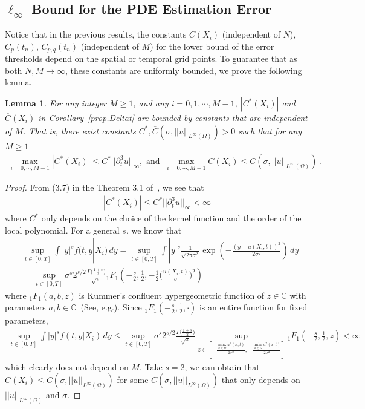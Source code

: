 \documentclass[a4paper,11pt]{article}
\newtheorem{lemma}{Lemma}[section]
\theoremstyle{definition}
\begin{document}
\subsection{$\ell_\infty$ Bound for the PDE Estimation Error}
Notice that in the previous results, the constants $C(X_i)$ (independent of $N$), $C_p(t_n)$, $C_{p,q}(t_n)$ (independent of $M$) for the lower bound of the error thresholds depend on the spatial or temporal grid points. To guarantee that as both $N,M\to\infty$, these constants are uniformly bounded, we prove the following lemma.
\begin{lemma}\label{lemma}
For any integer $M\geq 1$, and any $i=0,1,\cdots, M-1$,  $|C^*(X_i)|$ and $\overline{C}(X_i)$ in Corollary~\ref{prop.Deltat} are bounded by constants that are independent of $M$. That is, there exist constants $C^*, \overline{C}(\sigma,||u||_{L^\infty(\Omega)})>0$ such that for any $M\geq 1$
\begin{align*}
\max_{i=0,\cdots, M-1}|C^*(X_i)|\leq C^*||\partial_t^3u||_\infty, \text{ and }
~\max_{i=0,\cdots, M-1}\overline{C}(X_i)\leq \overline{C}(\sigma,||u||_{L^\infty(\Omega)})\;.
\end{align*}
\end{lemma}
\begin{proof}
From (3.7) in the Theorem 3.1 of~\cite{fan1997local}, we see that
\begin{align*}
|C^*(X_i)|\leq C^*||\partial_t^3u||_\infty<\infty
\end{align*}
where $C^*$ only depends on the choice of the kernel function and the order of the local polynomial. For a general $s$, we know that
\begin{align*}
&\sup_{t\in [0,T]}\int |y|^sf(t,y|X_i)\,dy=\sup_{t\in [0,T]}\int |y|^s\frac{1}{\sqrt{2\pi\sigma^2}}\exp(-\frac{(y-u(X_i,t))^2}{2\sigma^2})\,dy\\
&=\sup_{t\in[0,T]}\sigma^s2^{s/2}\frac{\Gamma\big(\frac{1+s}{2}\big)}{\sqrt{\pi}}{_1F_1}(-\frac{s}{2},\frac{1}{2},-\frac{1}{2}\Big(\frac{u(X_i,t)}{\sigma}\Big)^2)
\end{align*}
where ${_1F_1}(a,b,z)$ is Kummer's confluent hypergeometric function of $z\in\mathbb{C}$ with parameters $a,b\in\mathbb{C}$~(See, e.g.\cite{winkelbauer2012moments}). Since ${_1F_1}(-\frac{s}{2},\frac{1}{2},\cdot)$ is an entire function for fixed parameters,
\begin{align*}
\sup_{t\in [0,T]}\int |y|^sf(t,y|X_i)\,dy\leq 	\sup_{t\in[0,T]}\sigma^s2^{s/2}\frac{\Gamma\big(\frac{1+s}{2}\big)}{\sqrt{\pi}}\sup_{z\in [-\frac{\max_{x\in\Omega} u^2(x,t)}{2\sigma^2},-\frac{\min_{x\in\Omega} u^2(x,t)}{2\sigma^2}]}{_1F_1}(-\frac{s}{2},\frac{1}{2},z)<\infty
\end{align*}
which clearly does not depend on $M$. Take $s=2$, we can obtain that $\overline{C}(X_i)\leq \overline{C}(\sigma,||u||_{L^\infty(\Omega)})$ for some $\overline{C}(\sigma,||u||_{L^\infty(\Omega)})$ that only depends on $||u||_{L^\infty(\Omega)}$ and $\sigma$.
\end{proof}
\end{document}
